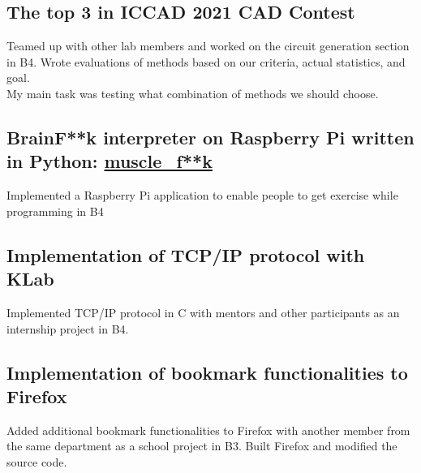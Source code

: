 \documentclass[10pt]{article}
\begin{document}
  \subsection*{The top 3 in ICCAD 2021 CAD Contest}
    Teamed up with other lab members and worked on the circuit generation section in B4.
    Wrote evaluations of methods based on our criteria, actual statistics, and goal.
    \\
    My main task was testing what combination of methods we should choose.
  \subsection*{BrainF**k interpreter on Raspberry Pi written in Python: \href{https://github.com/diohabara/muscle_fuck}{muscle\_f**k}}
    Implemented a Raspberry Pi application to enable people to get exercise while programming in B4
  \subsection*{Implementation of TCP/IP protocol with KLab}
    Implemented TCP/IP protocol in C with mentors and other participants as an internship project in B4.
  \subsection*{Implementation of bookmark functionalities to Firefox}
    Added additional bookmark functionalities to Firefox with another member from the same department as a school project in B3.
    Built Firefox and modified the source code.
\end{document}
